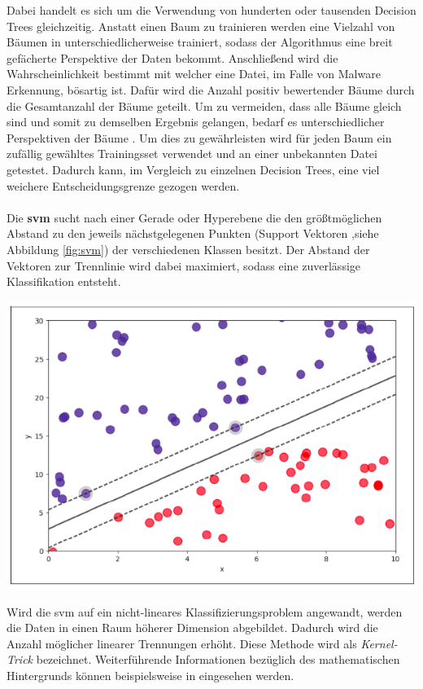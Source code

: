 \documentclass[
    12pt, %
    DIV10,
    ngerman, %
    a4paper, %
    oneside, %
    titlepage, %
    parskip=half, %
    headings=normal, %
    listof=totoc, %
    bibliography=totoc, %
    index=totoc, %
    captions=tableheading, %
    final %
]{scrreprt}
\begin{document}
Dabei handelt es sich um die Verwendung von hunderten oder tausenden Decision Trees gleichzeitig. Anstatt einen Baum zu trainieren werden eine Vielzahl von Bäumen in unterschiedlicherweise trainiert, sodass der Algorithmus eine breit gefächerte Perspektive der Daten bekommt. Anschließend wird die Wahrscheinlichkeit bestimmt mit welcher eine Datei, im Falle von Malware Erkennung, bösartig ist. Dafür wird die Anzahl positiv bewertender Bäume durch die Gesamtanzahl der Bäume geteilt. Um zu vermeiden, dass alle Bäume gleich sind und somit zu demselben Ergebnis gelangen, bedarf es unterschiedlicher Perspektiven der Bäume \parencite{JoshuaSaxe2018}. Um dies zu gewährleisten wird für jeden Baum ein zufällig gewähltes Trainingsset verwendet und an einer unbekannten Datei getestet. Dadurch kann, im Vergleich zu einzelnen Decision Trees, eine viel weichere Entscheidungsgrenze gezogen werden.
\\\\
Die \textbf{\acl{svm}} sucht nach einer Gerade oder Hyperebene die den größtmöglichen Abstand zu den jeweils nächstgelegenen Punkten (Support Vektoren ,siehe Abbildung \ref{fig:svm}) der verschiedenen Klassen besitzt. Der Abstand der Vektoren zur Trennlinie wird dabei maximiert, sodass eine zuverlässige Klassifikation entsteht.
\begin{center}
\includegraphics[scale=0.4]{img/svm.png}
\label{fig:svm}
\end{center}
Wird die \ac{svm} auf ein nicht-lineares Klassifizierungsproblem angewandt, werden die Daten in einen Raum höherer Dimension abgebildet. Dadurch wird die Anzahl möglicher linearer Trennungen erhöht. Diese Methode wird als \emph{Kernel-Trick} bezeichnet. Weiterführende Informationen bezüglich des mathematischen Hintergrunds können beispielsweise in \textcite{nguyen2018machine} eingesehen werden.
\end{document}
